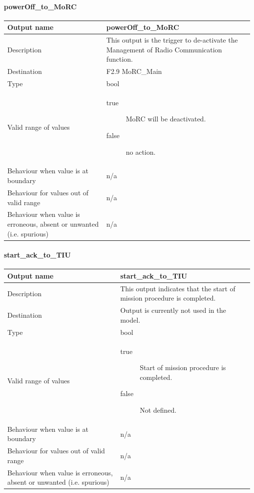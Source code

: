 \paragraph{powerOff\_to\_MoRC}

\begin{longtable}{p{}p{}}
\toprule
Output name				& powerOff\_to\_MoRC \\
\midrule
Description				& This output is the trigger to de-activate the Management of Radio Communication function. \\
\midrule
Destination				& F2.9 MoRC\_Main \\ 
\midrule
Type					& bool \\
\midrule
Valid range of values	& \begin{description}
\item[true]MoRC will be deactivated. 
\item[false]no action.
\end{description} \\
\midrule
Behaviour when value is at boundary	& n/a \\
\midrule
Behaviour for values out of valid range	& n/a \\
\midrule
Behaviour when value is erroneous, absent or unwanted (i.e. spurious) & n/a \\
\bottomrule
\end{longtable}

\paragraph{start\_ack\_to\_TIU}

\begin{longtable}{p{}p{}}
\toprule
Output name				& start\_ack\_to\_TIU \\
\midrule
Description				& This output indicates that the start of mission procedure is completed. \\
\midrule
Destination				& Output is currently not used in the model. \\ 
\midrule
Type					& bool \\
\midrule
Valid range of values	&  \begin{description}
\item[true]Start of mission procedure is completed.
\item[false]Not defined. 
\end{description} \\
\midrule
Behaviour when value is at boundary	& n/a \\
\midrule
Behaviour for values out of valid range	& n/a \\
\midrule
Behaviour when value is erroneous, absent or unwanted (i.e. spurious) & n/a \\
\bottomrule
\end{longtable}


